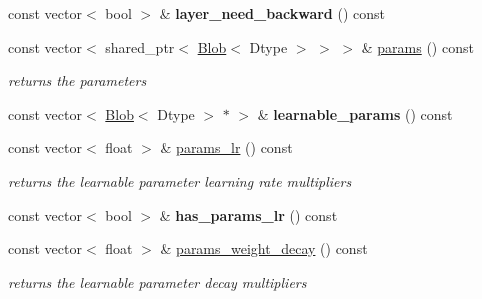 \begin{DoxyCompactItemize}
\item 
\mbox{\label{classcaffe_1_1_net_a878f773481d3014b972cab5f65642e58}} 
const vector$<$ bool $>$ \& {\bfseries layer\+\_\+need\+\_\+backward} () const
\item 
\mbox{\label{classcaffe_1_1_net_a4df30bbef7db3a6069d4ab3d9238cb40}} 
const vector$<$ shared\+\_\+ptr$<$ \mbox{\hyperlink{classcaffe_1_1_blob}{Blob}}$<$ Dtype $>$ $>$ $>$ \& \mbox{\hyperlink{classcaffe_1_1_net_a4df30bbef7db3a6069d4ab3d9238cb40}{params}} () const
\begin{DoxyCompactList}\small\item\em returns the parameters \end{DoxyCompactList}\item 
\mbox{\label{classcaffe_1_1_net_ababc9943a5f0f006cded03aeb727a314}} 
const vector$<$ \mbox{\hyperlink{classcaffe_1_1_blob}{Blob}}$<$ Dtype $>$ $\ast$ $>$ \& {\bfseries learnable\+\_\+params} () const
\item 
\mbox{\label{classcaffe_1_1_net_ae902a7a461c0a693ba1f0d4186ef8e42}} 
const vector$<$ float $>$ \& \mbox{\hyperlink{classcaffe_1_1_net_ae902a7a461c0a693ba1f0d4186ef8e42}{params\+\_\+lr}} () const
\begin{DoxyCompactList}\small\item\em returns the learnable parameter learning rate multipliers \end{DoxyCompactList}\item 
\mbox{\label{classcaffe_1_1_net_ae028e0f6241f6d9f8af19bd855cff8cb}} 
const vector$<$ bool $>$ \& {\bfseries has\+\_\+params\+\_\+lr} () const
\item 
\mbox{\label{classcaffe_1_1_net_a1bc1091f0033a8b6c321f1b50c931996}} 
const vector$<$ float $>$ \& \mbox{\hyperlink{classcaffe_1_1_net_a1bc1091f0033a8b6c321f1b50c931996}{params\+\_\+weight\+\_\+decay}} () const
\begin{DoxyCompactList}\small\item\em returns the learnable parameter decay multipliers \end{DoxyCompactList}\item 
\mbox{\label{classcaffe_1_1_net_aca6119790acd1da41f25d8a2955db232}} 

\end{DoxyCompactItemize}
